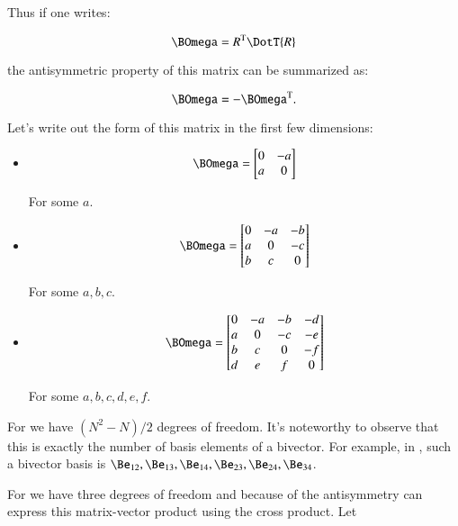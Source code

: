 Thus if one writes:

\begin{equation}\label{eqn:keRot:bodyangularvelocitymatrix}
\BOmega = \transpose{R}\DotT{R}
\end{equation}

the antisymmetric property of this matrix can be summarized as:

\[
\BOmega = -\transpose{\BOmega}.
\]

Let's write out the form of this matrix in the first few dimensions:

\begin{itemize}
\item {}

\[
\BOmega = 
\begin{bmatrix}
0 & -a \\
a & 0  \\
\end{bmatrix}
\]

For some $a$.

\item {}

\[
\BOmega = 
\begin{bmatrix}
0 & -a & -b \\
a &  0 & -c \\
b &  c &  0 \\
\end{bmatrix}
\]

For some $a, b, c$.

\item {}

\[
\BOmega = 
\begin{bmatrix}
0 & -a & -b & -d \\
a & 0 & -c & -e \\
b & c & 0 & -f \\
d & e & f & 0 \\
\end{bmatrix}
\]

For some $a, b, c, d, e, f$.
\end{itemize}

For  we have $(N^2-N)/2$ degrees of freedom.  It's noteworthy to observe that this is exactly the number of basis elements of a bivector.  For example, in , such a bivector basis is
$\Be_{12}, \Be_{13}, \Be_{14}, \Be_{23}, \Be_{24}, \Be_{34}$.

For  we have three degrees of freedom and because of the antisymmetry 
can express this matrix-vector product using the cross product.  Let

